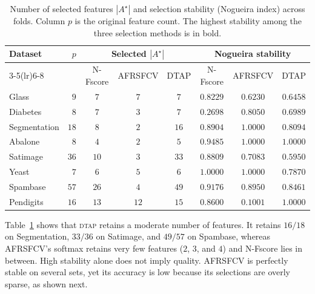 \documentclass[]{interact}
\theoremstyle{plain}
\theoremstyle{definition}
\theoremstyle{remark}
\newcommand{\dtap}{\textsc{dtap}}
\begin{document}
\begin{table}[htbp]
\centering\small
\caption{Number of selected features $|A^\star|$ and selection stability (Nogueira index) across folds. Column $p$ is the original feature count. The highest stability among the three selection methods is in bold.}\label{tab:nfeat}
\begin{tabular}{lr ccc ccc}
\toprule
\multirow{2}{*}{Dataset} & \multirow{2}{*}{$p$} & \multicolumn{3}{c}{Selected $|A^\star|$} & \multicolumn{3}{c}{Nogueira stability} \\
\cmidrule(lr){3-5}\cmidrule(lr){6-8}
             &      & N-Fscore & AFRSFCV & DTAP & N-Fscore          & AFRSFCV           & DTAP              \\
\midrule
Glass        & $9$  & $7$      & $7$     & $7$  & $\mathbf{0.8229}$ & $0.6230$          & $0.6458$          \\
Diabetes     & $8$  & $7$      & $3$     & $7$  & $0.2698$          & $\mathbf{0.8050}$ & $0.6989$          \\
Segmentation & $18$ & $8$      & $2$     & $16$ & $0.8904$          & $\mathbf{1.0000}$ & $0.8094$          \\
Abalone      & $8$  & $4$      & $2$     & $5$  & $0.9485$          & $\mathbf{1.0000}$ & $\mathbf{1.0000}$ \\
Satimage     & $36$ & $10$     & $3$     & $33$ & $\mathbf{0.8809}$ & $0.7083$          & $0.5950$          \\
Yeast        & $7$  & $6$      & $5$     & $6$  & $\mathbf{1.0000}$ & $\mathbf{1.0000}$ & $0.7870$          \\
Spambase     & $57$ & $26$     & $4$     & $49$ & $\mathbf{0.9176}$ & $0.8950$          & $0.8461$          \\
Pendigits    & $16$ & $13$     & $12$    & $15$ & $0.8600$          & $0.1001$          & $\mathbf{1.0000}$ \\
\bottomrule
\end{tabular}
\end{table}

Table~\ref{tab:nfeat} shows that \dtap{} retains a moderate number of features. It retains $16/18$ on Segmentation, $33/36$ on Satimage, and $49/57$ on Spambase, whereas AFRSFCV's softmax retains very few features ($2$, $3$, and $4$) and N-Fscore lies in between. High stability alone does not imply quality. AFRSFCV is perfectly stable on several sets, yet its accuracy is low because its selections are overly sparse, as shown next.
\end{document}
